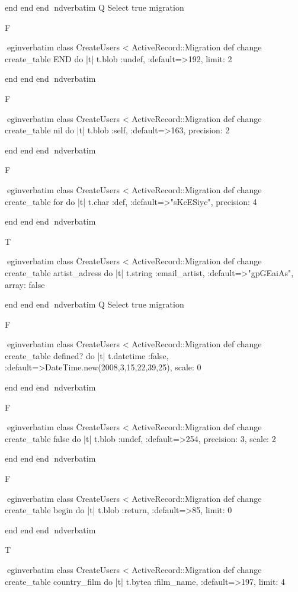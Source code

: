     end 
  end 
end
nd{verbatim}
Q
 Select true migration

F

egin{verbatim}
 class CreateUsers < ActiveRecord::Migration 
  def change 
    create_table END do |t| 
      t.blob :undef, :default=>192, limit: 2
    
    end 
  end 
end
nd{verbatim}

F

egin{verbatim}
 class CreateUsers < ActiveRecord::Migration 
  def change 
    create_table nil do |t| 
      t.blob :self, :default=>163, precision: 2
    
    end 
  end 
end
nd{verbatim}

F

egin{verbatim}
 class CreateUsers < ActiveRecord::Migration 
  def change 
    create_table for do |t| 
      t.char :def, :default=>"sKcESiyc", precision: 4
    
    end 
  end 
end
nd{verbatim}

T

egin{verbatim}
 class CreateUsers < ActiveRecord::Migration 
  def change 
    create_table artist_adress do |t| 
      t.string :email_artist, :default=>"gpGEaiAs", array: false
    
    end 
  end 
end
nd{verbatim}
Q
 Select true migration

F

egin{verbatim}
 class CreateUsers < ActiveRecord::Migration 
  def change 
    create_table defined? do |t| 
      t.datetime :false, :default=>DateTime.new(2008,3,15,22,39,25), scale: 0
    
    end 
  end 
end
nd{verbatim}

F

egin{verbatim}
 class CreateUsers < ActiveRecord::Migration 
  def change 
    create_table false do |t| 
      t.blob :undef, :default=>254, precision: 3, scale: 2
    
    end 
  end 
end
nd{verbatim}

F

egin{verbatim}
 class CreateUsers < ActiveRecord::Migration 
  def change 
    create_table begin do |t| 
      t.blob :return, :default=>85, limit: 0
    
    end 
  end 
end
nd{verbatim}

T

egin{verbatim}
 class CreateUsers < ActiveRecord::Migration 
  def change 
    create_table country_film do |t| 
      t.bytea :film_name, :default=>197, limit: 4
    

